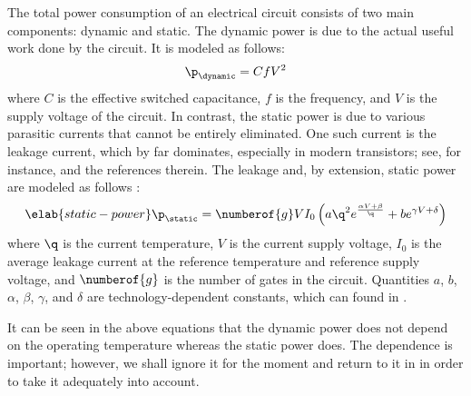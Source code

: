 The total power consumption of an electrical circuit consists of two main
components: dynamic and static. The dynamic power is due to the actual useful
work done by the circuit. It is modeled as follows:
\[
  \p_\dynamic = C f V^2
\]
where $C$ is the effective switched capacitance, $f$ is the frequency, and $V$
is the supply voltage of the circuit. In contrast, the static power is due to
various parasitic currents that cannot be entirely eliminated. One such current
is the leakage current, which by far dominates, especially in modern 
transistors; see, for instance, \cite{chandrakasan2000, srivastava2010,
juan2011, juan2012} and the references therein. The leakage and, by extension,
static power are modeled as follows \cite{liao2005}:
\begin{equation} \elab{static-power}
  \p_\static = \numberof{g} V I_0 \left(a \q^2 e^{\frac{\alpha V + \beta}{\q}} + b e^{\gamma V + \delta}\right)
\end{equation}
where $\q$ is the current temperature, $V$ is the current supply voltage, $I_0$
is the average leakage current at the reference temperature and reference supply
voltage, and $\numberof{g}$ is the number of gates in the circuit. Quantities
$a$, $b$, $\alpha$, $\beta$, $\gamma$, and $\delta$ are technology-dependent
constants, which can found in \cite{liao2005}.

It can be seen in the above equations that the dynamic power does not depend on
the operating temperature whereas the static power does. The dependence is
important; however, we shall ignore it for the moment and return to it in
 in order to take it adequately into account.

